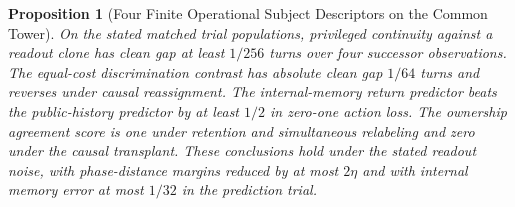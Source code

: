 \documentclass[11pt,a4paper]{article}
\newtheorem{proposition}{Proposition}[section]
\theoremstyle{definition}
\begin{document}
\begin{proposition}[Four Finite Operational Subject Descriptors on the Common Tower]\label{prop:writable-tower-subject-descriptors}
On the stated matched trial populations, privileged continuity against a readout clone has clean gap at least $1/256$ turns over four successor observations. The equal-cost discrimination contrast has absolute clean gap $1/64$ turns and reverses under causal reassignment. The internal-memory return predictor beats the public-history predictor by at least $1/2$ in zero-one action loss. The ownership agreement score is one under retention and simultaneous relabeling and zero under the causal transplant. These conclusions hold under the stated readout noise, with phase-distance margins reduced by at most $2\eta$ and with internal memory error at most $1/32$ in the prediction trial.
\end{proposition}
\end{document}
